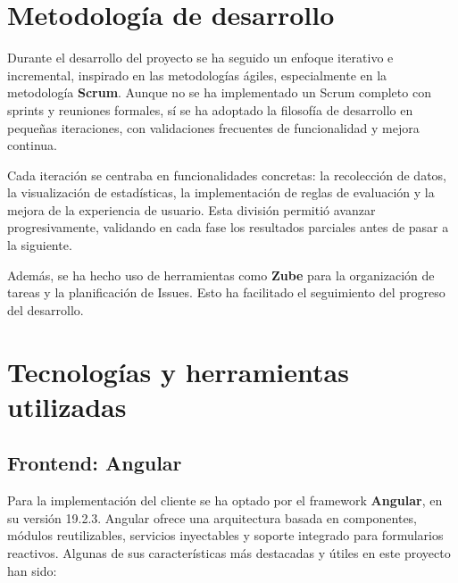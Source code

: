 

\section{Metodología de desarrollo}

Durante el desarrollo del proyecto se ha seguido un enfoque iterativo e incremental, inspirado en las metodologías ágiles, especialmente en la metodología \textbf{Scrum}. Aunque no se ha implementado un Scrum completo con sprints y reuniones formales, sí se ha adoptado la filosofía de desarrollo en pequeñas iteraciones, con validaciones frecuentes de funcionalidad y mejora continua.

Cada iteración se centraba en funcionalidades concretas: la recolección de datos, la visualización de estadísticas, la implementación de reglas de evaluación y la mejora de la experiencia de usuario. Esta división permitió avanzar progresivamente, validando en cada fase los resultados parciales antes de pasar a la siguiente.

Además, se ha hecho uso de herramientas como \textbf{Zube} para la organización de tareas y la planificación de Issues. Esto ha facilitado el seguimiento del progreso del desarrollo.

\section{Tecnologías y herramientas utilizadas}

\subsection{Frontend: Angular}

Para la implementación del cliente se ha optado por el framework \textbf{Angular}, en su versión 19.2.3. Angular ofrece una arquitectura basada en componentes, módulos reutilizables, servicios inyectables y soporte integrado para formularios reactivos. Algunas de sus características más destacadas y útiles en este proyecto han sido:

